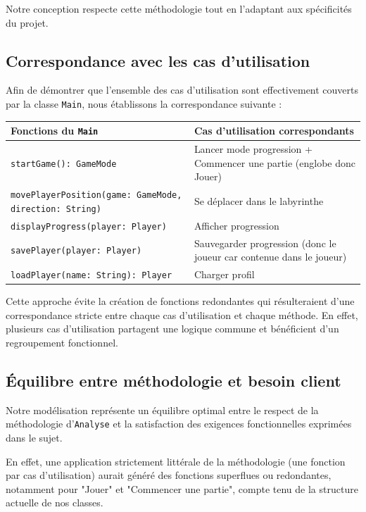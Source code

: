 \documentclass{butexFR}
\begin{document}
Notre conception respecte cette méthodologie tout en l'adaptant aux spécificités du projet. 

\subsection{Correspondance avec les cas d'utilisation}

Afin de démontrer que l'ensemble des cas d'utilisation sont effectivement couverts par la classe \texttt{Main}, nous établissons la correspondance suivante :

\vspace{1em}
\begin{center}
\begin{tabular}{|p{5cm}|p{8cm}|}
\hline
\textbf{Fonctions du \texttt{Main}} & \textbf{Cas d'utilisation correspondants} \\
\hline
\texttt{startGame(): GameMode} & Lancer mode progression + Commencer une partie (englobe donc Jouer)\\
\hline
\texttt{movePlayerPosition(game: GameMode, direction: String)} & Se déplacer dans le labyrinthe \\
\hline
\texttt{displayProgress(player: Player)} & Afficher progression \\
\hline
\texttt{savePlayer(player: Player)}  & Sauvegarder progression (donc le joueur car contenue dans le joueur)\\
\hline
\texttt{loadPlayer(name: String): Player} & Charger profil \\
\hline
\end{tabular}
\end{center}
\vspace{1em}

Cette approche évite la création de fonctions redondantes qui résulteraient d'une correspondance stricte entre chaque cas d'utilisation et chaque méthode. En effet, plusieurs cas d'utilisation partagent une logique commune et bénéficient d'un regroupement fonctionnel.

\subsection{Équilibre entre méthodologie et besoin client}

Notre modélisation représente un équilibre optimal entre le respect de la méthodologie d'\texttt{Analyse} et la satisfaction des exigences fonctionnelles exprimées dans le sujet.

En effet, une application strictement littérale de la méthodologie (une fonction par cas d'utilisation) aurait généré des fonctions superflues ou redondantes, notamment pour "Jouer" et "Commencer une partie", compte tenu de la structure actuelle de nos classes. 
\end{document}
